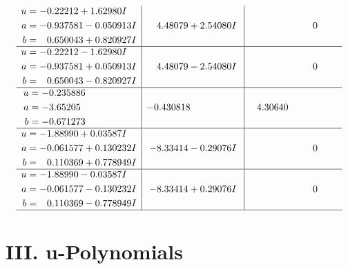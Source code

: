 \documentclass[1p]{elsarticle_modified}
\theoremstyle{definition}
\begin{document}
$$\begin{array}{c|c|c}
\begin{aligned}
u &= -0.22212 + 1.62980 I \\
a &= -0.937581 - 0.050913 I \\
b &= \phantom{-}0.650043 + 0.820927 I\end{aligned}
 & \phantom{-}4.48079 + 2.54080 I & \phantom{-0.000000 } 0 \\ \hline\begin{aligned}
u &= -0.22212 - 1.62980 I \\
a &= -0.937581 + 0.050913 I \\
b &= \phantom{-}0.650043 - 0.820927 I\end{aligned}
 & \phantom{-}4.48079 - 2.54080 I & \phantom{-0.000000 } 0 \\ \hline\begin{aligned}
u &= -0.235886\phantom{ +0.000000I} \\
a &= -3.65205\phantom{ +0.000000I} \\
b &= -0.671273\phantom{ +0.000000I}\end{aligned}
 & -0.430818\phantom{ +0.000000I} & \phantom{-}4.30640\phantom{ +0.000000I} \\ \hline\begin{aligned}
u &= -1.88990 + 0.03587 I \\
a &= -0.061577 + 0.130232 I \\
b &= \phantom{-}0.110369 + 0.778949 I\end{aligned}
 & -8.33414 - 0.29076 I & \phantom{-0.000000 } 0 \\ \hline\begin{aligned}
u &= -1.88990 - 0.03587 I \\
a &= -0.061577 - 0.130232 I \\
b &= \phantom{-}0.110369 - 0.778949 I\end{aligned}
 & -8.33414 + 0.29076 I & \phantom{-0.000000 } 0\\
 \hline 
 \end{array}$$\newpage
\newpage\renewcommand{\arraystretch}{1}
\centering \section*{ III. u-Polynomials}
\end{document}
